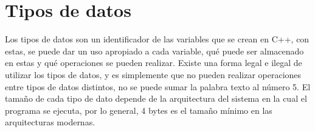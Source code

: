 \section{Tipos de datos}
\hspace{0.55cm}Los tipos de datos son un identificador de las variables que se crean en C++, con estas, se puede dar un uso apropiado a cada variable, qué puede ser almacenado en estas y qué operaciones se pueden realizar. Existe una forma legal e ilegal de utilizar los tipos de datos, y es simplemente que no pueden realizar operaciones entre tipos de datos distintos, no se puede sumar la palabra texto al número 5. El tamaño de cada tipo de dato depende de la arquitectura del sistema en la cual el programa se ejecuta, por lo general, 4 bytes es el tamaño mínimo en las arquitecturas modernas.



